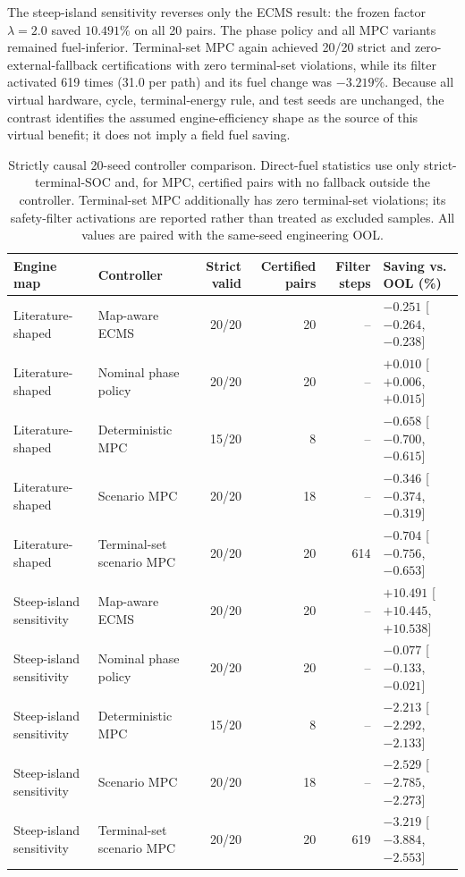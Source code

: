 \documentclass[energies,article,submit,moreauthors]{Definitions/mdpi}
\begin{document}
The steep-island sensitivity reverses only the ECMS result: the frozen factor $\lambda=2.0$ saved $10.491\%$ on all 20 pairs. The phase policy and all MPC variants remained fuel-inferior. Terminal-set MPC again achieved 20/20 strict and zero-external-fallback certifications with zero terminal-set violations, while its filter activated 619 times (31.0 per path) and its fuel change was $-3.219\%$. Because all virtual hardware, cycle, terminal-energy rule, and test seeds are unchanged, the contrast identifies the assumed engine-efficiency shape as the source of this virtual benefit; it does not imply a field fuel saving.

\begin{table}[H]
\centering
\caption{Strictly causal 20-seed controller comparison. Direct-fuel statistics use only strict-terminal-SOC and, for MPC, certified pairs with no fallback outside the controller. Terminal-set MPC additionally has zero terminal-set violations; its safety-filter activations are reported rather than treated as excluded samples. All values are paired with the same-seed engineering OOL.}
\label{tab:framework}
\scriptsize
\setlength{\tabcolsep}{3pt}
\begin{tabular}{llrrrl}
\toprule
Engine map & Controller & Strict valid & Certified pairs & Filter steps & Saving vs. OOL (\%) \\
\midrule
Literature-shaped & Map-aware ECMS & 20/20 & 20 & -- & $-0.251$ [$-0.264$, $-0.238$] \\
Literature-shaped & Nominal phase policy & 20/20 & 20 & -- & $+0.010$ [$+0.006$, $+0.015$] \\
Literature-shaped & Deterministic MPC & 15/20 & 8 & -- & $-0.658$ [$-0.700$, $-0.615$] \\
Literature-shaped & Scenario MPC & 20/20 & 18 & -- & $-0.346$ [$-0.374$, $-0.319$] \\
Literature-shaped & Terminal-set scenario MPC & 20/20 & 20 & 614 & $-0.704$ [$-0.756$, $-0.653$] \\
\midrule
Steep-island sensitivity & Map-aware ECMS & 20/20 & 20 & -- & $+10.491$ [$+10.445$, $+10.538$] \\
Steep-island sensitivity & Nominal phase policy & 20/20 & 20 & -- & $-0.077$ [$-0.133$, $-0.021$] \\
Steep-island sensitivity & Deterministic MPC & 15/20 & 8 & -- & $-2.213$ [$-2.292$, $-2.133$] \\
Steep-island sensitivity & Scenario MPC & 20/20 & 18 & -- & $-2.529$ [$-2.785$, $-2.273$] \\
Steep-island sensitivity & Terminal-set scenario MPC & 20/20 & 20 & 619 & $-3.219$ [$-3.884$, $-2.553$] \\
\bottomrule
\end{tabular}
\end{table}
\end{document}
